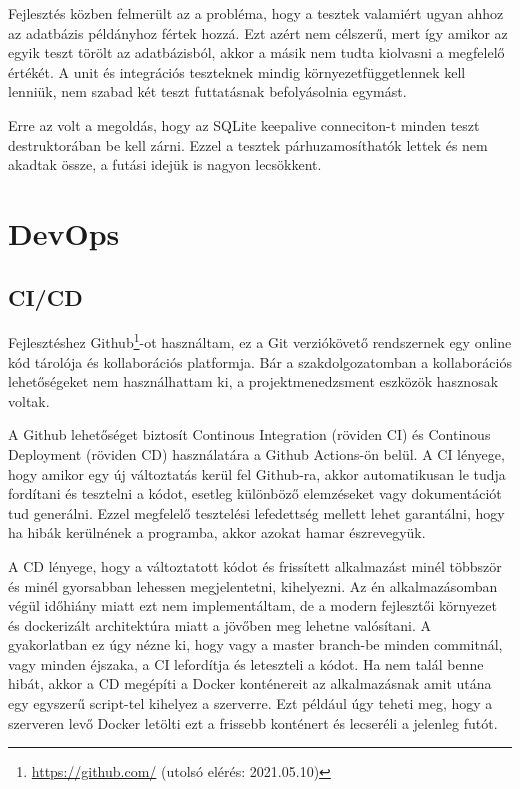 Fejlesztés közben felmerült az a probléma, hogy a tesztek valamiért ugyan ahhoz az adatbázis példányhoz fértek hozzá. Ezt azért nem célszerű, mert így amikor az egyik teszt törölt az adatbázisból, akkor a másik nem tudta kiolvasni a megfelelő értékét. A unit és integrációs teszteknek mindig környezetfüggetlennek kell lenniük, nem szabad két teszt futtatásnak befolyásolnia egymást.

Erre az volt a megoldás, hogy az SQLite keepalive conneciton-t minden teszt destruktorában be kell zárni. Ezzel a tesztek párhuzamosíthatók lettek és nem akadtak össze, a futási idejük is nagyon lecsökkent.

\section{DevOps}
\subsection{CI/CD}
Fejlesztéshez Github\footnote{\url{https://github.com/} (utolsó elérés: 2021.05.10)}-ot használtam, ez a Git verziókövető rendszernek egy online kód tárolója és kollaborációs platformja. Bár a szakdolgozatomban a kollaborációs lehetőségeket nem használhattam ki, a projektmenedzsment eszközök hasznosak voltak.

A Github lehetőséget biztosít Continous Integration (röviden CI) és Continous Deployment (röviden CD) használatára a Github Actions-ön belül. A CI lényege, hogy amikor egy új változtatás kerül fel Github-ra, akkor automatikusan le tudja fordítani és tesztelni a kódot, esetleg különböző elemzéseket vagy dokumentációt tud generálni. Ezzel megfelelő tesztelési lefedettség mellett lehet garantálni, hogy ha hibák kerülnének a programba, akkor azokat hamar észrevegyük.

A CD lényege, hogy a változtatott kódot és frissített alkalmazást minél többször és minél gyorsabban lehessen megjelentetni, kihelyezni. Az én alkalmazásomban végül időhiány miatt ezt nem implementáltam, de a modern fejlesztői környezet és dockerizált architektúra miatt a jövőben meg lehetne valósítani. A gyakorlatban ez úgy nézne ki, hogy vagy a master branch-be minden commitnál, vagy minden éjszaka, a CI lefordítja és leteszteli a kódot. Ha nem talál benne hibát, akkor a CD megépíti a Docker konténereit az alkalmazásnak amit utána egy egyszerű script-tel kihelyez a szerverre. Ezt például úgy teheti meg, hogy a szerveren levő Docker letölti ezt a frissebb konténert és lecseréli a jelenleg futót.

